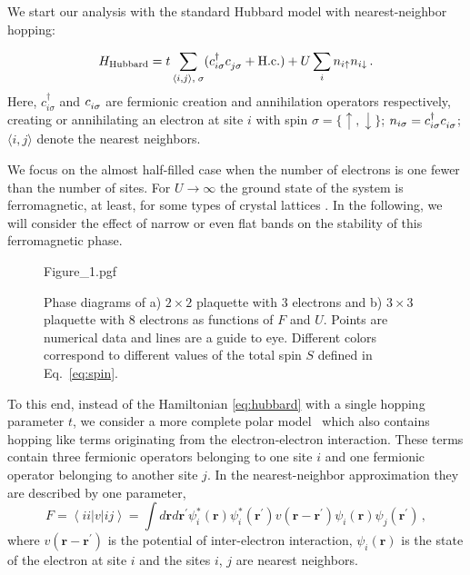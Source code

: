 
We start our analysis with the standard Hubbard model with nearest-neighbor hopping:

\begin{equation}\label{eq:hubbard}
    H_\text{Hubbard} = t \sum_{\substack{\langle i,j\rangle, \;\sigma}} (c^\dagger_{i\sigma} c^{\vphantom{\dagger}}_{j\sigma} + \text{H.c.})
      + U \sum_{i} n_{i\uparrow}n_{i\downarrow} \,.
\end{equation}
Here, $c^\dagger_{i\sigma}$ and $c^{\vphantom{\dagger}}_{i\sigma}$ are fermionic creation and annihilation operators respectively, creating or annihilating an electron at site $i$ with spin $\sigma = \{ \uparrow, \downarrow \}$; $n_{i\sigma} = c^\dagger_{i\sigma} c^{\vphantom{\dagger}}_{i\sigma}$; $\langle i, j \rangle$ denote the nearest neighbors.

We focus on the almost half-filled case when the number of electrons is one fewer than the number of sites. For $U\to \infty$ the ground state of the system is ferromagnetic, at least, for some types of crystal lattices \cite{nagaoka1966ferromagnetism}. In the following, we will consider the effect of narrow or even flat bands on the stability of this ferromagnetic phase. 

\begin{figure*}[t]
    \centering
    {Figure_1.pgf}
    \caption{Phase diagrams of a) $2\times 2$ plaquette with 3 electrons and b) $3\times 3$ plaquette with 8 electrons as functions of $F$ and $U$. Points are numerical data and lines are a guide to eye. Different colors correspond to different values of the total spin $S$ defined in Eq.~\eqref{eq:spin}.}
    \label{fig:ferromagnetism}
\end{figure*}

To this end, instead of the Hamiltonian \eqref{eq:hubbard} with a single hopping parameter $t$, we consider a more complete polar model~\cite{schubin1934electron,vonsovsky1979some1,vonsovsky1979some2} which also contains hopping like terms originating from the electron-electron interaction. These terms contain three fermionic operators belonging to one site $i$ and one fermionic operator belonging to another site $j$. In the nearest-neighbor approximation they are described by one parameter,
\begin{equation}\label{eq:coulomb}
    F \!= \left\langle ii\left| v\right| ij\right\rangle \!= \!\!\int d{\mathbf{r}}d{\mathbf{r}}%
^{\prime }\psi _{i}^{\ast }({\mathbf{r}})\psi _{i}^{\ast }({\mathbf{r}}^{\prime
})v\left( {\mathbf{r-r}}^{\prime }\right) \psi _{i}({\mathbf{r}})\psi _{j}({\mathbf{r}}%
^{\prime }) \,,
\end{equation}
where $v\left( {\mathbf{r-r}}^{\prime }\right)$ is the potential of inter-electron interaction, $\psi _{i}({\mathbf{r}})$ is the state of the electron at site $i$ and the sites $i$, $j$ are nearest neighbors. 

